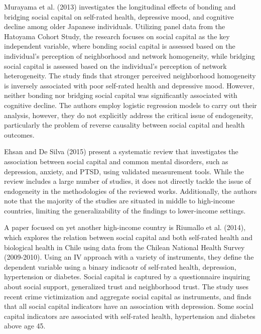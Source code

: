     Murayama et al. (2013) investigates the longitudinal effects of bonding and bridging social capital on self-rated health, depressive mood, and cognitive decline among older Japanese individuals. Utilizing panel data from the Hatoyama Cohort Study, the research focuses on social capital as the key independent variable, where bonding social capital is assessed based on the individual's perception of neighborhood and network homogeneity, while bridging social capital is assessed based on the individual's perception of network heterogeneity.
    The study finds that stronger perceived neighborhood homogeneity is inversely associated with poor self-rated health and depressive mood. However, neither bonding nor bridging social capital was significantly associated with cognitive decline.
    The authors employ logistic regression models to carry out their analysis, however, they do not explicitly address the critical issue of endogeneity, particularly the problem of reverse causality between social capital and health outcomes. 

    Ehsan and De Silva (2015) present a systematic review that investigates the association between social capital and common mental disorders, such as depression, anxiety, and PTSD, using validated measurement tools. While the review includes a large number of studies, it does not directly tackle the issue of endogeneity in the methodologies of the reviewed works. Additionally, the authors note that the majority of the studies are situated in middle to high-income countries, limiting the generalizability of the findings to lower-income settings.

    A paper focused on yet another high-income country is Riumallo et al. (2014), which explores the relation between social capital and both self-rated health and biological health in Chile using data from the Chilean National Health Survey (2009-2010). Using an IV approach with a variety of instruments, they define the dependent variable using a binary indicaotr of self-rated health, depression, hypertension or diabetes. Social capital is captured by a questionnaire inquiring about social support, generalized trust and neighborhood trust. The study uses recent crime victimization and aggregate social capital as instruments, and finds that all social capital indicators have an association with depression. Some social capital indicators are associated with self-rated health, hypertension and diabetes above age 45.

